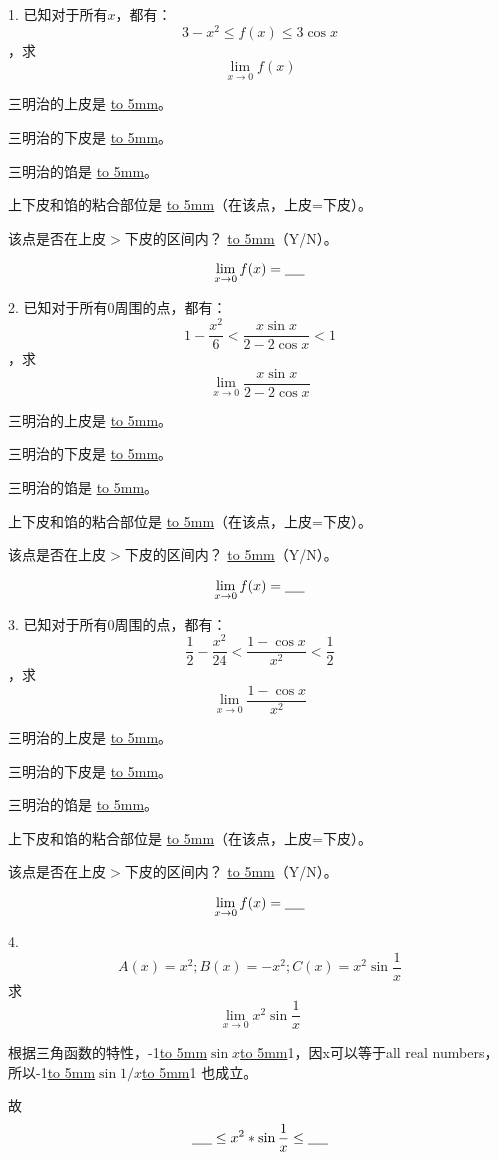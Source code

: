 \documentclass[UTF8]{ctexart}
\begin{document}
1. 已知对于所有$x$，都有：\[3-x^2 \leq f(x) \leq 3\cos{x}\]，求\[{\lim_{x \to 0} f(x)}\]

三明治的上皮是 \underline{\hbox to 5mm{}}。

三明治的下皮是 \underline{\hbox to 5mm{}}。

三明治的馅是 \underline{\hbox to 5mm{}}。

上下皮和馅的粘合部位是 \underline{\hbox to 5mm{}}（在该点，上皮=下皮）。

该点是否在上皮$>$下皮的区间内？ \underline{\hbox to 5mm{}}（Y/N）。

\[{\lim_{x \to 0} f(x)} = \underline{\hbox to 5mm{}}\]

2. 已知对于所有0周围的点，都有：\[1-\frac{x^2}{6} < \frac{x\sin{x}}{2-2\cos{x}}<1\]，求\[{\lim_{x \to 0} \frac{x\sin{x}}{2-2\cos{x}}}\]

三明治的上皮是 \underline{\hbox to 5mm{}}。

三明治的下皮是 \underline{\hbox to 5mm{}}。

三明治的馅是 \underline{\hbox to 5mm{}}。

上下皮和馅的粘合部位是 \underline{\hbox to 5mm{}}（在该点，上皮=下皮）。

该点是否在上皮$>$下皮的区间内？ \underline{\hbox to 5mm{}}（Y/N）。

\[{\lim_{x \to 0} f(x)} = \underline{\hbox to 5mm{}}\]

3. 已知对于所有0周围的点，都有：\[\frac{1}{2}-\frac{x^2}{24} < \frac{1-\cos{x}}{x^2}<\frac{1}{2}\]，求\[{\lim_{x \to 0} \frac{1-\cos{x}}{x^2}}\]

三明治的上皮是 \underline{\hbox to 5mm{}}。

三明治的下皮是 \underline{\hbox to 5mm{}}。

三明治的馅是 \underline{\hbox to 5mm{}}。

上下皮和馅的粘合部位是 \underline{\hbox to 5mm{}}（在该点，上皮=下皮）。

该点是否在上皮$>$下皮的区间内？ \underline{\hbox to 5mm{}}（Y/N）。

\[{\lim_{x \to 0} f(x)} = \underline{\hbox to 5mm{}}\]

4. \[A(x) = x^2; B(x) = -x^2; C(x) = x^2\sin{\frac{1}{x}}\]
求\[{\lim_{x \to 0} x^2\sin{\frac{1}{x}}}\]

根据三角函数的特性，-1\underline{\hbox to 5mm{}}$\sin{x}$\underline{\hbox to 5mm{}}1，因x可以等于all real numbers，所以-1\underline{\hbox to 5mm{}}$\sin{1/x}$\underline{\hbox to 5mm{}}1 也成立。

故\[\underline{\hbox to 5mm{}}  \leq x^2*\sin{\frac{1}{x}} \leq \underline{\hbox to 5mm{}} \]
\end{document}

